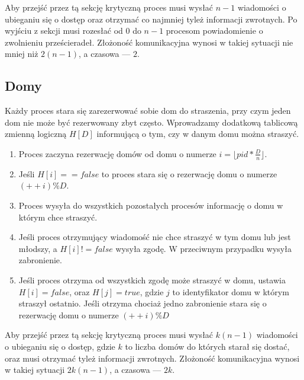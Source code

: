 \documentclass{article}
\begin{document}
Aby przejść przez tą sekcję krytyczną proces musi wysłać $n-1$ wiadomości o ubieganiu się o dostęp 
oraz otrzymać co najmniej tyleż informacji zwrotnych.
Po wyjściu z sekcji musi rozesłać od $0$ do $n-1$ procesom powiadomienie o zwolnieniu prześcieradeł.
Złożoność komunikacyjna wynosi w takiej sytuacji nie mniej niż $2(n-1)$, a czasowa --- $2$.

\subsection{Domy}
Każdy proces stara się zarezerwować sobie dom do straszenia, przy czym jeden dom nie może być rezerwowany zbyt często. Wprowadzamy dodatkową tablicową zmienną logiczną $H[D]$ informującą o tym, czy w danym domu można straszyć.
\begin{enumerate}
    \item Proces zaczyna rezerwację domów od domu o numerze $ i = \lfloor pid * \frac{D}{n} \rfloor$.
    \item Jeśli $H[i] == false$ to proces stara się o rezerwację domu o numerze $(++i) \% D$.
    \item Proces wysyła do wszystkich pozostałych procesów informację o domu w którym chce straszyć.
    \item Jeśli proces otrzymujący wiadomość nie chce straszyć w tym domu lub jest młodszy, a $H[i] != false$  wysyła zgodę. W przeciwnym przypadku wysyła zabronienie.
    \item Jeśli proces otrzyma od wszystkich zgodę może straszyć w domu, ustawia $H[i] = false$, oraz $H[j] = true$, gdzie $j$ to identyfikator domu w którym straszył ostatnio. Jeśli otrzyma chociaż jedno zabronienie stara się o rezerwację domu o numerze $(++i) \% D$
\end{enumerate}

Aby przejść przez tą sekcję krytyczną proces musi wysłać $k(n-1)$ wiadomości o ubieganiu się o dostęp, gdzie $k$ to liczba domów do których starał się dostać,
oraz musi otrzymać tyleż informacji zwrotnych.
Złożoność komunikacyjna wynosi w takiej sytuacji $2k(n-1)$, a czasowa --- $2k$.






\end{document}
